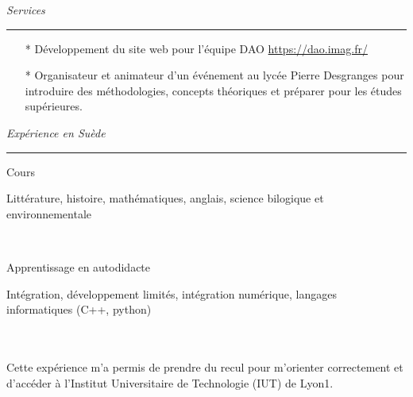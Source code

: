 \documentclass[a4paper,10pt, french]{article}
\begin{document}
\noindent
\textit{\Large \color{MyGray} \hspace{5mm} Services}
\vspace{2mm}
{\color{DefaultGray}\hrule height .1pt}
\vspace{5mm}

\begin{itemize}
  \setlength\itemsep{3mm}
  \item[*] Développement du site web pour l'équipe DAO \url{https://dao.imag.fr/}
  \item[*] Organisateur et animateur d'un événement au lycée Pierre Desgranges pour introduire des méthodologies, concepts théoriques et préparer pour les études supérieures.
\end{itemize}
\vspace{5mm}

\noindent
\textit{\Large \color{MyGray} \hspace{5mm} Expérience en Suède}
\vspace{2mm}
{\color{DefaultGray}\hrule height .1pt}
\vspace{5mm}

\noindent
\begin{minipage}{0.20\textwidth}
  \color{MyGray} Cours
\end{minipage}
\hfill
\begin{minipage}{0.70\textwidth}
  Littérature, histoire, mathématiques, anglais, science bilogique et environnementale
\end{minipage}\\
\vspace{2mm}

\noindent
\begin{minipage}{0.20\textwidth}
  \color{MyGray} Apprentissage en autodidacte
\end{minipage}
\hfill
\begin{minipage}{0.70\textwidth}
  Intégration, développement limités, intégration numérique, langages informatiques (C++, python)
\end{minipage}\\
\vspace{2mm}

\paragraph{} Cette expérience m'a permis de prendre du recul pour m'orienter correctement et d'accéder à l'Institut Universitaire de Technologie (IUT) de Lyon1.
\end{document}
